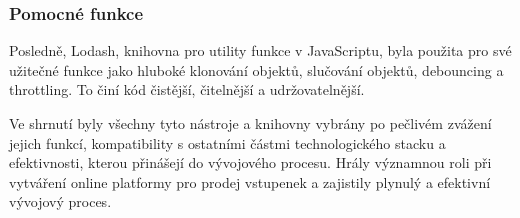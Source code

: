 \subsubsection{Pomocné funkce}
\label{subsubsec:implementace-techologie-ostatni-pomocne-funkce}
Posledně, Lodash, knihovna pro utility funkce v JavaScriptu, byla použita pro své užitečné funkce jako hluboké klonování objektů, slučování objektů, debouncing a throttling.
To činí kód čistější, čitelnější a udržovatelnější.

Ve shrnutí byly všechny tyto nástroje a knihovny vybrány po pečlivém zvážení jejich funkcí, kompatibility s ostatními částmi technologického stacku a efektivnosti, kterou přinášejí do vývojového procesu.
Hrály významnou roli při vytváření online platformy pro prodej vstupenek a zajistily plynulý a efektivní vývojový proces.
